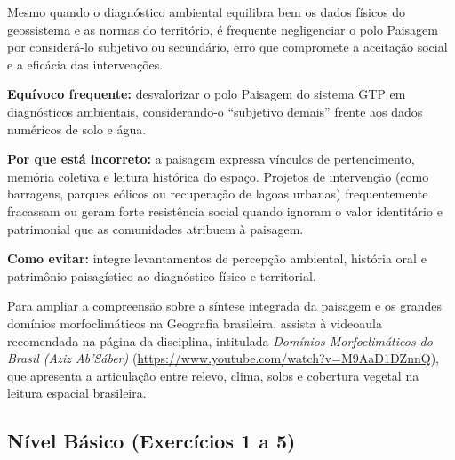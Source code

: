 
Mesmo quando o diagnóstico ambiental equilibra bem os dados físicos do geossistema e as normas do território, é frequente negligenciar o polo Paisagem por considerá-lo subjetivo ou secundário, erro que compromete a aceitação social e a eficácia das intervenções.

\begin{boxErro}
\textbf{Equívoco frequente:} desvalorizar o polo Paisagem do sistema GTP em diagnósticos ambientais, considerando-o ``subjetivo demais'' frente aos dados numéricos de solo e água.

\textbf{Por que está incorreto:} a paisagem expressa vínculos de pertencimento, memória coletiva e leitura histórica do espaço. Projetos de intervenção (como barragens, parques eólicos ou recuperação de lagoas urbanas) frequentemente fracassam ou geram forte resistência social quando ignoram o valor identitário e patrimonial que as comunidades atribuem à paisagem.

\textbf{Como evitar:} integre levantamentos de percepção ambiental, história oral e patrimônio paisagístico ao diagnóstico físico e territorial.
\end{boxErro}

Para ampliar a compreensão sobre a síntese integrada da paisagem e os grandes domínios morfoclimáticos na Geografia brasileira, assista à videoaula recomendada na página da disciplina, intitulada \textit{Domínios Morfoclimáticos do Brasil (Aziz Ab'Sáber)} (\url{https://www.youtube.com/watch?v=M9AaD1DZnnQ}), que apresenta a articulação entre relevo, clima, solos e cobertura vegetal na leitura espacial brasileira.


\subsection*{Nível Básico (Exercícios 1 a 5)}

